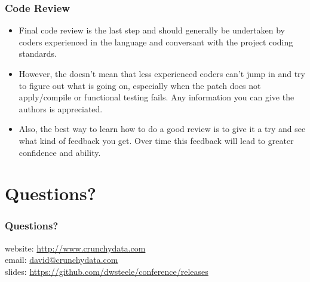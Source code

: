 \begin{frame}
    \frametitle{Code Review}

    \begin{itemize}
        \item Final code review is the last step and should generally be undertaken by coders experienced in the language and conversant with the project coding standards.\pause

        \item However, the doesn't mean that less experienced coders can't jump in and try to figure out what is going on, especially when the patch does not apply/compile or functional testing fails.  Any information you can give the authors is appreciated.\pause

        \item Also, the best way to learn how to do a good review is to give it a try and see what kind of feedback you get.  Over time this feedback will lead to greater confidence and ability.
    \end{itemize}
\end{frame}

\section{Questions?}

\begin{frame}
    \frametitle{Questions?}

    website: \url{http://www.crunchydata.com}\\
    \vspace{1em}
    email: \href{mailto:david@crunchydata.com}{david@crunchydata.com}\\
    \vspace{1em}
    slides: \url{https://github.com/dwsteele/conference/releases}\\
\end{frame}


